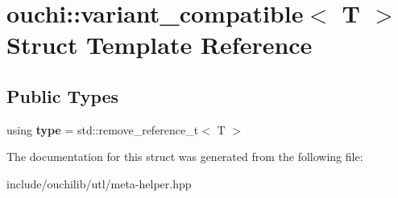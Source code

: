 \hypertarget{structouchi_1_1variant__compatible}{}\section{ouchi\+::variant\+\_\+compatible$<$ T $>$ Struct Template Reference}
\label{structouchi_1_1variant__compatible}
\subsection*{Public Types}
\begin{DoxyCompactItemize}
\item 
\mbox{\label{structouchi_1_1variant__compatible_a71550d9fa8d82bc482cbbf0ccae8dc40}} 
using {\bfseries type} = std\+::remove\+\_\+reference\+\_\+t$<$ T $>$
\end{DoxyCompactItemize}


The documentation for this struct was generated from the following file\+:\begin{DoxyCompactItemize}
\item 
include/ouchilib/utl/meta-\/helper.\+hpp\end{DoxyCompactItemize}
